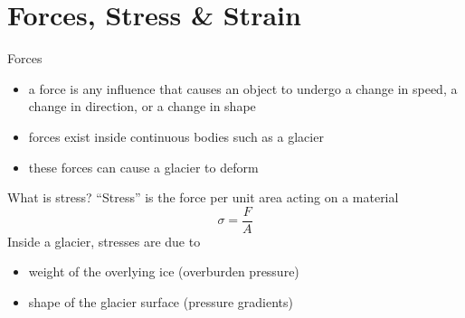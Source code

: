 \documentclass[hide notes,intlimits]{beamer}
\begin{document}
\section{Forces, Stress \& Strain}

\begin{frame}{Forces}
  \begin{itemize}
  \item a force is any influence that causes an object to undergo a change in speed, a change in direction, or a change in shape
  \item forces exist inside continuous bodies such as a glacier
  \item these forces can cause a glacier to deform
  \end{itemize}
\end{frame}

\begin{frame}{What is stress?}
  ``Stress'' is the force per unit area acting on a material
  \begin{displaymath}
    \sigma = \frac{F}{A}
  \end{displaymath}
  Inside a glacier, stresses are due to
  \begin{itemize}
  \item weight of the overlying ice (overburden pressure)
  \item shape of the glacier surface (pressure gradients)
  \end{itemize}
\end{frame}
\end{document}
